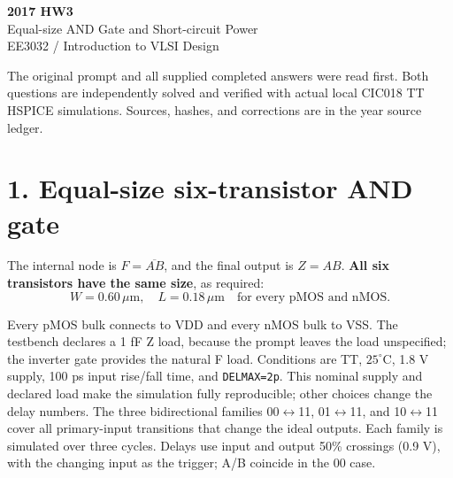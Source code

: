 \documentclass[11pt,a4paper]{article}
\newcommand{\VDD}{V_{\mathrm{DD}}}
\newcommand{\VSS}{V_{\mathrm{SS}}}
\newcommand{\MOS}[5]{
  \coordinate (#1) at (#2,#3);
  \coordinate (#1t) at ($(#1)+(0,.55)$);
  \coordinate (#1b) at ($(#1)+(0,-.55)$);
  \draw (#1t)--($(#1)+(0,.30)$)--($(#1)+(-.18,.30)$);
  \draw ($(#1)+(-.18,.34)$)--($(#1)+(-.18,-.34)$);
  \draw ($(#1)+(-.18,-.30)$)--($(#1)+(0,-.30)$)--(#1b);
  \draw ($(#1)+(-.35,.33)$)--($(#1)+(-.35,-.33)$);
  \def\type{#5}\def\ptype{p}
  \ifx\type\ptype
    \draw ($(#1)+(-.78,0)$)--($(#1)+(-.53,0)$);
    \draw ($(#1)+(-.465,0)$) circle (.065);
    \draw ($(#1)+(-.40,0)$)--($(#1)+(-.35,0)$);
  \else
    \draw ($(#1)+(-.78,0)$)--($(#1)+(-.35,0)$);
  \fi
  \node[anchor=east] at ($(#1)+(-.82,0)$) {$#4$};
  \node[anchor=west,font=\scriptsize] at ($(#1)+(.10,0)$) {#1};
}
\begin{document}
\begin{center}{\LARGE\bfseries 2017 HW3}\\[4pt]{\large Equal-size AND Gate and Short-circuit Power}\\[4pt]{\small EE3032 / Introduction to VLSI Design}\end{center}
The original prompt and all supplied completed answers were read first. Both questions are independently solved and verified with actual local CIC018 TT HSPICE simulations. Sources, hashes, and corrections are in the year source ledger.

\section*{1. Equal-size six-transistor AND gate}
The internal node is $F=\overline{AB}$, and the final output is $Z=AB$. \textbf{All six transistors have the same size}, as required:
\[
 \boxed{W=0.60\,\mu\mathrm m,\quad L=0.18\,\mu\mathrm m\quad\text{for every pMOS and nMOS}.}
\]
\begin{center}\end{center}
Every pMOS bulk connects to VDD and every nMOS bulk to VSS. The testbench declares a 1 fF Z load, because the prompt leaves the load unspecified; the inverter gate provides the natural F load. Conditions are TT, $25^\circ$C, 1.8 V supply, 100 ps input rise/fall time, and \texttt{DELMAX=2p}. This nominal supply and declared load make the simulation fully reproducible; other choices change the delay numbers.
The three bidirectional families 00$\leftrightarrow$11, 01$\leftrightarrow$11, and 10$\leftrightarrow$11 cover all primary-input transitions that change the ideal outputs. Each family is simulated over three cycles. Delays use input and output 50\% crossings (0.9 V), with the changing input as the trigger; A/B coincide in the 00 case.
\end{document}
